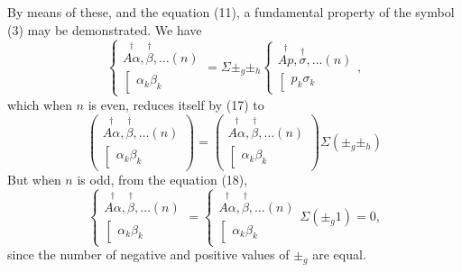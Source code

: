 \documentclass[11pt,a4paper]{book}
\begin{document}
By means of these, and the equation (11), a fundamental property of the symbol
(3) may be demonstrated. We have
\[
\left\{\begin{array}{c}
\stackrel{\dagger}{A\alpha}, \stackrel{\dagger}{\beta}, \ldots (n) \\
\left[\begin{array}{c}
\alpha_k\beta_k
\end{array}\right.
\end{array}\right.
= \Sigma \pm_g \pm_h
\left\{\begin{array}{c}
\stackrel{\dagger}{Ap}, \stackrel{\dagger}{\sigma}, \ldots (n) \\
\left[\begin{array}{c}
p_k\sigma_k
\end{array}\right.
\end{array}\right.
\tag{18},
\]
which when $n$ is even, reduces itself by (17) to
\[
\left(\begin{array}{c}
\stackrel{\dagger}{A\alpha}, \stackrel{\dagger}{\beta}, \ldots (n) \\
\left[\begin{array}{c}
\alpha_k\beta_k
\end{array}\right.
\end{array}\right)
=
\left(\begin{array}{c}
\stackrel{\dagger}{A\alpha}, \stackrel{\dagger}{\beta}, \ldots (n) \\
\left[\begin{array}{c}
\alpha_k\beta_k
\end{array}\right.
\end{array}\right)
\Sigma(\pm_g \pm_h)
\tag{20}
\]
But when $n$ is odd, from the equation (18),
\[
\left\{\begin{array}{c}
\stackrel{\dagger}{A\alpha}, \stackrel{\dagger}{\beta}, \ldots (n) \\
\left[\begin{array}{c}
\alpha_k\beta_k
\end{array}\right.
\end{array}\right.
=
\left\{\begin{array}{c}
\stackrel{\dagger}{A\alpha}, \stackrel{\dagger}{\beta}, \ldots (n) \\
\left[\begin{array}{c}
\alpha_k\beta_k
\end{array}\right.
\end{array}\right.
\Sigma(\pm_g 1) = 0
\tag{21},
\]
since the number of negative and positive values of $\pm_g$ are equal.
\end{document}
